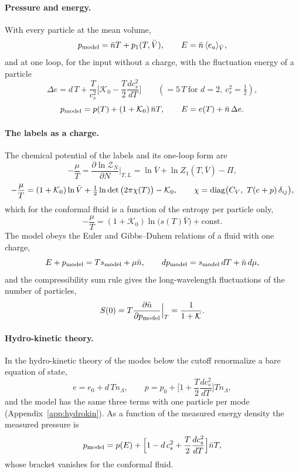 \documentclass[11pt,aps,preprint,nofootinbib,superscriptaddress,tightenlines]{revtex4-2}
\newcommand{\avg}[1]{\langle #1\rangle}
\def\st{\begin{equation}}
\def\stp{\end{equation}}
\def\App#1{Appendix~\ref{#1}}
\let\oldparagraph\paragraph
\renewcommand{\paragraph}{\par\bigskip\oldparagraph}
\begin{document}
\paragraph{Pressure and energy.}  With every particle at the mean volume,
\st
p_{\rm model}=\bar nT+p_1(T,\bar V),\qquad E=\bar n\,\avg{e_a}_{\bar V},
\label{pE}
\stp
and at one loop, for the input without a charge, with the fluctuation energy of a particle
\st
\Delta e=d\,T+\frac{T}{c_s^2}\Big[\mathcal K_0-\frac T2\frac{dc_s^2}{dT}\Big]\qquad(=5\,T\ \text{for }d=2,\ c_s^2=\tfrac12),
\label{Deltae}
\stp
\st
p_{\rm model}=p(T)+(1+\mathcal K_0)\,\bar nT,\qquad E=e(T)+\bar n\,\Delta e .
\label{pEloop}
\stp

\paragraph{The labels as a charge.}  The chemical potential of the labels and its one-loop form are
\st
-\frac\mu T=\frac{\partial\ln\mathcal Z_N}{\partial N}\Big|_{T,L}=\ln\bar V+\ln Z_1(T,\bar V)-\Pi,
\label{mu}
\stp
\st
-\frac\mu T=(1+\mathcal K_0)\ln\bar V+\tfrac12\ln\det\big(2\pi\chi(T)\big)-\mathcal K_0,\qquad \chi={\rm diag}\big(C_V,\ T(e+p)\,\delta_{ij}\big),
\label{muloop}
\stp
which for the conformal fluid is a function of the entropy per particle only,
\st
-\frac\mu T=(1+\mathcal K_0)\ln\big(s(T)\bar V\big)+\text{const} .
\label{muconf}
\stp
The model obeys the Euler and Gibbs--Duhem relations of a fluid with one charge,
\st
E+p_{\rm model}=Ts_{\rm model}+\mu\bar n,\qquad dp_{\rm model}=s_{\rm model}\,dT+\bar n\,d\mu ,
\label{GD}
\stp
and the compressibility sum rule gives the long-wavelength fluctuations of the number of particles,
\st
S(0)=T\frac{\partial\bar n}{\partial p_{\rm model}}\Big|_T=\frac{1}{1+\mathcal K} .
\label{S0}
\stp

\paragraph{Hydro-kinetic theory.}  In the hydro-kinetic theory of \cite{amt} the modes below the cutoff renormalize a bare equation of state,
\st
e=e_0+d\,Tn_\Lambda,\qquad p=p_0+\Big[1+\frac T2\frac{dc_s^2}{dT}\Big]Tn_\Lambda ,
\label{amt35}
\stp
and the model has the same three terms with one particle per mode (\App{app:hydrokin}).  As a function of the measured energy density the measured pressure is
\st
p_{\rm model}=p(E)+\Big[1-d\,c_s^2+\frac T2\frac{dc_s^2}{dT}\Big]\bar nT ,
\label{PofE}
\stp
whose bracket vanishes for the conformal fluid.
\end{document}
